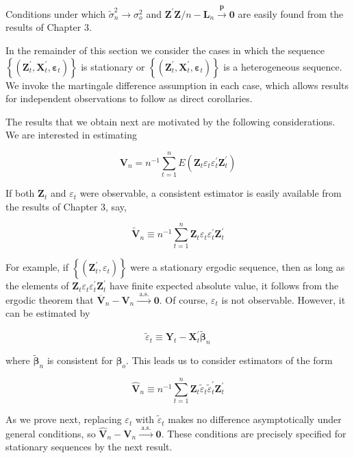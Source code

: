 \documentclass[10pt]{article}
\begin{document}
Conditions under which $\tilde{\sigma}_{n}^{2} \rightarrow \sigma_{o}^{2}$ and $\mathbf{Z}^{\prime} \mathbf{Z} / n-\mathbf{L}_{n} \xrightarrow{\boldsymbol{p}} \mathbf{0}$ are easily found from the results of Chapter 3.

In the remainder of this section we consider the cases in which the sequence $\left\{\left(\mathbf{Z}_{t}^{\prime}, \mathbf{X}_{t}^{\prime}, \boldsymbol{\varepsilon}_{t}\right)\right\}$ is stationary or $\left\{\left(\mathbf{Z}_{t}^{\prime}, \mathbf{X}_{t}^{\prime}, \boldsymbol{\varepsilon}_{t}\right)\right\}$ is a heterogeneous sequence. We invoke the martingale difference assumption in each case, which allows results for independent observations to follow as direct corollaries.

The results that we obtain next are motivated by the following considerations. We are interested in estimating

$$
\mathbf{V}_{n}=n^{-1} \sum_{t=1}^{n} E\left(\mathbf{Z}_{t} \varepsilon_{t} \varepsilon_{t}^{\prime} \mathbf{Z}_{t}^{\prime}\right)
$$

If both $\mathbf{Z}_{t}$ and $\varepsilon_{t}$ were observable, a consistent estimator is easily available from the results of Chapter 3, say,

$$
\tilde{\mathbf{V}}_{n} \equiv n^{-1} \sum_{t=1}^{n} \mathbf{Z}_{t} \varepsilon_{t} \varepsilon_{t}^{\prime} \mathbf{Z}_{t}^{\prime}
$$

For example, if $\left\{\left(\mathbf{Z}_{t}^{\prime}, \varepsilon_{t}\right)\right\}$ were a stationary ergodic sequence, then as long as the elements of $\mathbf{Z}_{t} \varepsilon_{t} \varepsilon_{t}^{\prime} \mathbf{Z}_{t}^{\prime}$ have finite expected absolute value, it follows from the ergodic theorem that $\overline{\mathbf{V}}_{n}-\mathbf{V}_{n} \xrightarrow{\text { a.s. }} \mathbf{0}$. Of course, $\varepsilon_{t}$ is not observable. However, it can be estimated by

$$
\tilde{\varepsilon}_{t} \equiv \mathbf{Y}_{t}-\mathbf{X}_{t}^{\prime} \tilde{\boldsymbol{\beta}}_{n}
$$

where $\tilde{\boldsymbol{\beta}}_{n}$ is consistent for $\boldsymbol{\beta}_{o}$. This leads us to consider estimators of the form

$$
\hat{\mathbf{V}}_{n} \equiv n^{-1} \sum_{t=1}^{n} \mathbf{Z}_{t} \tilde{\varepsilon}_{t} \tilde{\varepsilon}_{t}^{\prime} \mathbf{Z}_{t}^{\prime}
$$

As we prove next, replacing $\varepsilon_{t}$ with $\tilde{\varepsilon}_{t}$ makes no difference asymptotically under general conditions, so $\hat{\mathbf{V}}_{n}-\mathbf{V}_{n} \xrightarrow{\text { a.s. }} \mathbf{0}$. These conditions are precisely specified for stationary sequences by the next result.
\end{document}
